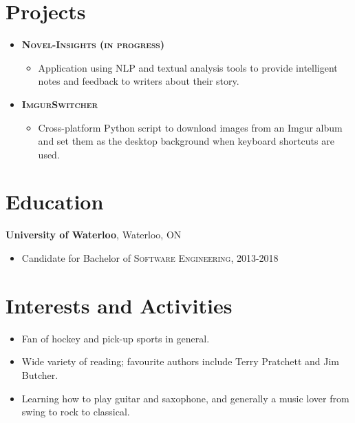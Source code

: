\documentclass[a4paper,10pt]{article}
\begin{document}
\section{Projects}
\begin{itemize}
	\item {\textsc{\textbf{Novel-Insights (in progress)}}
	\begin{itemize}
		\item {Application using NLP and textual analysis tools to provide intelligent notes and feedback to writers about their story. }
	\end{itemize}}
	
	\item {\textsc{\textbf{ImgurSwitcher}}}
	\begin{itemize}
		\item {Cross-platform Python script to download images from an Imgur album and set them as the desktop background when keyboard shortcuts are used.}
	\end{itemize}
\end{itemize}

\section{Education}
\textbf{University of Waterloo}, Waterloo, ON
\begin{itemize}
	\item Candidate for Bachelor of \textsc{Software Engineering}, 2013-2018
\end{itemize}

\section{Interests and Activities}
\begin{itemize}
	\item {Fan of hockey and pick-up sports in general.}
	\item {Wide variety of reading; favourite authors include Terry Pratchett and Jim Butcher.}
	\item {Learning how to play guitar and saxophone, and generally a music lover from swing to rock to classical.}
\end{itemize}
\end{document}
